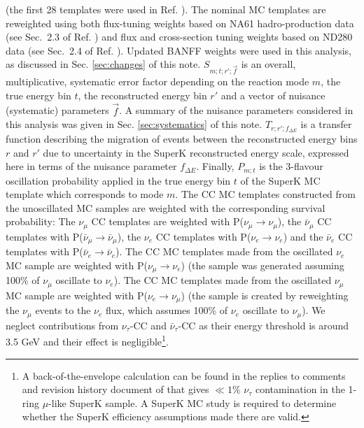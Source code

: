 (the first 28 templates were used in Ref. \cite{OurRun123DisappAnalysis3Flavour}).
The nominal MC templates are reweighted using both
flux-tuning weights based on NA61 hadro-production data (see Sec.\ 2.3 of Ref. \cite{OurRun123DisappAnalysis3Flavour})
and flux and cross-section tuning weights based on ND280 data (see Sec.\ 2.4 of Ref. \cite{OurRun123DisappAnalysis3Flavour}).
Updated BANFF weights were used in this analysis, as discussed in Sec. \ref{sec:changes} of this note.
$S_{m;t;r\prime;\vec{f}}$ is an overall, multiplicative, systematic error factor
depending on the reaction mode $m$, the true energy bin $t$, the reconstructed energy bin $r\prime$
and a vector of nuisance (systematic) parameters $\vec{f}$.
A summary of the nuisance parameters considered in this analysis was given in Sec. \ref{sec:systematics} of this note.
$T_{r;r\prime;f_{{\Delta}E}}$ is a transfer function describing the migration of events
between the reconstructed energy bins $r$ and $r\prime$ due to uncertainty in the SuperK reconstructed energy
scale, expressed here in terms of the nuisance parameter $f_{{\Delta}E}$.
Finally, $P_{m;t}$ is the 3-flavour oscillation probability applied in the true energy
bin $t$ of the SuperK MC template which corresponds to mode $m$.
The CC MC templates constructed from the unoscillated MC samples are weighted
with the corresponding survival probability:
The $\nu_{\mu}$ CC templates are weighted with P($\nu_{\mu}\rightarrow\nu_{\mu}$),
the $\bar{\nu}_{\mu}$ CC templates with P($\bar{\nu}_{\mu}\rightarrow\bar{\nu}_{\mu}$),
the $\nu_{e}$ CC templates with P($\nu_{e}\rightarrow\nu_{e}$) and
the $\bar{\nu}_{e}$ CC templates with P($\bar{\nu}_{e}\rightarrow\bar{\nu}_{e}$).
The CC MC templates made from the oscillated $\nu_{e}$ MC sample are weighted with
P($\nu_{\mu}\rightarrow\nu_{e}$) (the sample was generated assuming 100\% of
$\nu_{\mu}$ oscillate to $\nu_{e}$).
The CC MC templates made from the oscillated $\nu_{\mu}$ MC sample are
weighted with P($\nu_{e}\rightarrow\nu_{\mu}$) (the sample is created
by reweighting the $\nu_\mu$ events to the $\nu_e$ flux, which assumes 100\% of
$\nu_{e}$ oscillate to $\nu_{\mu}$).
We neglect contributions from $\nu_{\tau}$-CC and $\bar{\nu}_{\tau}$-CC as their
energy threshold is around 3.5 GeV and their effect is
negligible\footnote{
A back-of-the-envelope calculation can be found in the replies to
comments and revision history document of
\cite{OurRun123DisappAnalysis3Flavour} that gives $\ll 1\%$ $\nu_\tau$
contamination in the 1-ring $\mu$-like SuperK sample. A SuperK MC study is required
to determine whether the SuperK efficiency assumptions made there are valid.
  }.
